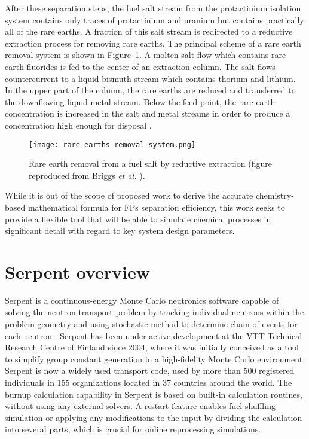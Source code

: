 After these separation steps, the fuel salt stream from the protactinium 
isolation system contains only traces of protactinium and uranium but contains 
practically all of the rare earths. A fraction of this salt stream is 
redirected to a reductive extraction process for removing rare earths.  The 
principal scheme of a rare earth removal system is shown in  
Figure~\ref{fig:rare-earth-removal}. A molten salt flow which contains 
rare earth fluorides is fed to the center of an extraction column. The salt 
flows countercurrent to a liquid bismuth stream which contains thorium and 
lithium. In the upper part of the column, the rare earths are reduced and 
transferred to the downflowing liquid metal stream. Below the feed point, the 
rare earth concentration is increased in the salt and metal streams in order 
to produce a concentration high enough for disposal 
\cite{briggs_molten-salt_1969}.
\begin{figure}[htbp!]
	\centering
	\texttt{[image: rare-earths-removal-system.png]}
	\caption{Rare earth removal from a fuel salt by reductive extraction 
	(figure reproduced from Briggs \emph{et al.} 
	\cite{briggs_molten-salt_1969}).}
	\label{fig:rare-earth-removal}
\end{figure}

While it is out of the scope of proposed work to derive the accurate 
chemistry-based mathematical formula for \glspl{FP} separation efficiency, 
this work seeks to provide a flexible tool that will be able to simulate 
chemical processes in significant detail with regard to key system design 
parameters.

\section{Serpent overview}
Serpent is a continuous-energy Monte Carlo neutronics software capable of 
solving the neutron transport problem by tracking individual neutrons within 
the problem geometry and using stochastic method to determine chain of events 
for each neutron \cite{leppanen_serpent_2014}. Serpent has been under active 
development at the VTT Technical Research Centre of Finland since 2004, where 
it was initially conceived as a tool to simplify group constant generation in 
a high-fidelity Monte Carlo environment. Serpent is now a widely used 
transport code, used by more than 500 
registered individuals in 155 organizations located in 37 countries around the 
world. The burnup calculation capability in Serpent is based on built-in 
calculation routines, without using any external solvers. A restart feature 
enables fuel shuffling simulation or applying any modifications to the input 
by dividing the calculation into several parts, which is crucial for online 
reprocessing simulations.

